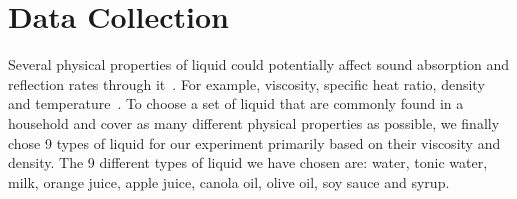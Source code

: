 \documentclass{article} %
\begin{document}




\section{Data Collection}
\label{sec:dataCollection}
Several physical properties of liquid could potentially affect sound absorption and reflection rates through it~\cite{parthasarathy1955sound}. For example, viscosity, specific heat ratio, density and temperature~\cite{absorb}. To choose a set of liquid that are commonly found in a household and cover as many different physical properties as possible, we finally chose 9 types of liquid for our experiment primarily based on their viscosity and density. The 9 different types of liquid we have chosen are: water, tonic water, milk, orange juice, apple juice, canola oil, olive oil, soy sauce and syrup.
\end{document}
